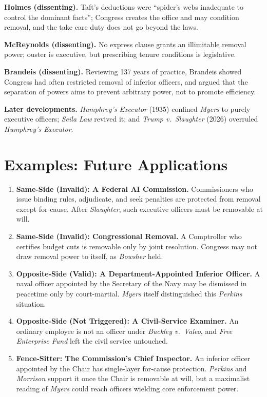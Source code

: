 \documentclass[12pt]{article}
\begin{document}
\textbf{Holmes (dissenting).} Taft's deductions were ``spider's webs inadequate to control the dominant facts''; Congress creates the office and may condition removal, and the take care duty does not go beyond the laws.

\textbf{McReynolds (dissenting).} No express clause grants an illimitable removal power; ouster is executive, but prescribing tenure conditions is legislative.

\textbf{Brandeis (dissenting).} Reviewing 137 years of practice, Brandeis showed Congress had often restricted removal of inferior officers, and argued that the separation of powers aims to prevent arbitrary power, not to promote efficiency.

\textbf{Later developments.} \textit{Humphrey's Executor} (1935) confined \textit{Myers} to purely executive officers; \textit{Seila Law} revived it; and \textit{Trump v.\ Slaughter} (2026) overruled \textit{Humphrey's Executor}.

\section{Examples: Future Applications}

\begin{enumerate}
\item \textbf{Same-Side (Invalid): A Federal AI Commission.} Commissioners who issue binding rules, adjudicate, and seek penalties are protected from removal except for cause. After \textit{Slaughter}, such executive officers must be removable at will.
\item \textbf{Same-Side (Invalid): Congressional Removal.} A Comptroller who certifies budget cuts is removable only by joint resolution. Congress may not draw removal power to itself, as \textit{Bowsher} held.
\item \textbf{Opposite-Side (Valid): A Department-Appointed Inferior Officer.} A naval officer appointed by the Secretary of the Navy may be dismissed in peacetime only by court-martial. \textit{Myers} itself distinguished this \textit{Perkins} situation.
\item \textbf{Opposite-Side (Not Triggered): A Civil-Service Examiner.} An ordinary employee is not an officer under \textit{Buckley v.\ Valeo}, and \textit{Free Enterprise Fund} left the civil service untouched.
\item \textbf{Fence-Sitter: The Commission's Chief Inspector.} An inferior officer appointed by the Chair has single-layer for-cause protection. \textit{Perkins} and \textit{Morrison} support it once the Chair is removable at will, but a maximalist reading of \textit{Myers} could reach officers wielding core enforcement power.
\end{enumerate}
\end{document}
